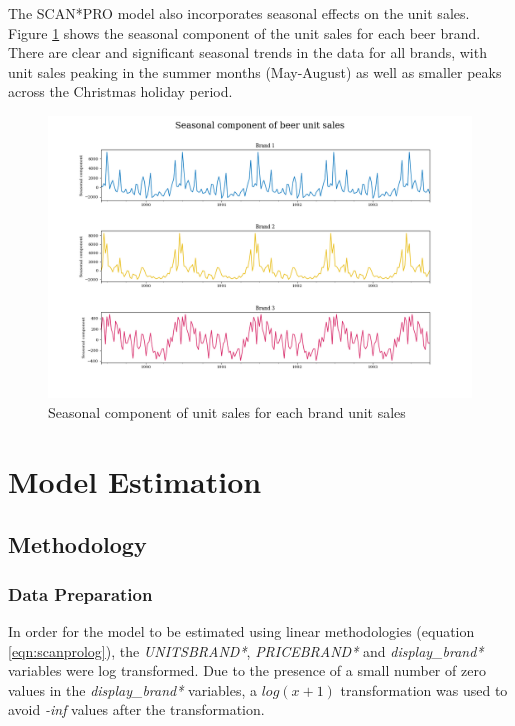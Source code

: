 \documentclass[a4paper,11pt]{article}
\begin{document}
The SCAN*PRO model also incorporates seasonal effects on the unit sales. Figure \ref{fig:seasonal-plots} shows the seasonal component of the unit sales for each beer brand. There are clear and significant seasonal trends in the data for all brands, with unit sales peaking in the summer months (May-August) as well as smaller peaks across the Christmas holiday period.


\begin{figure}
  \centering
  \includegraphics[scale=0.38]{seasonal_plots}
  \caption{Seasonal component of unit sales for each brand unit sales}\label{fig:seasonal-plots}
\end{figure}

\newpage

\section{Model Estimation}
\subsection{Methodology}

\subsubsection{Data Preparation}
In order for the model to be estimated using linear methodologies (equation \ref{eqn:scanprolog}), the \textit{UNITSBRAND*}, \textit{PRICEBRAND*} and \textit{display\_brand*} variables were log transformed. Due to the presence of a small number of zero values in the \textit{display\_brand*} variables, a $log(x+1)$ transformation \citep{wooldridge_multiple_2016} was used to avoid \textit{-inf} values after the transformation.
\end{document}
